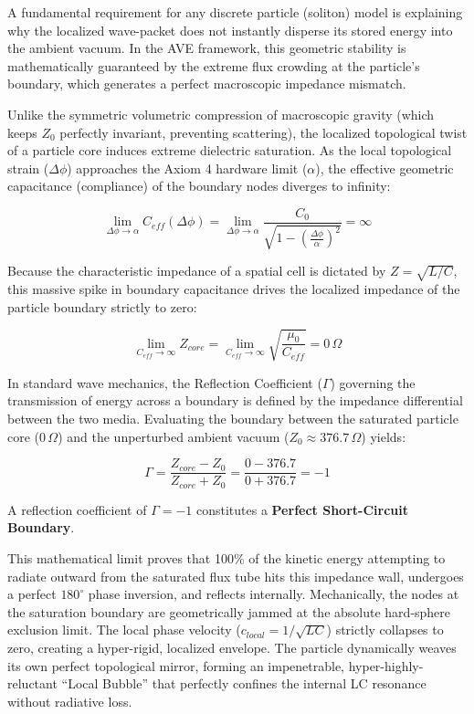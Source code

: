 A fundamental requirement for any discrete particle (soliton) model is explaining why the
localized wave-packet does not instantly disperse its stored energy into the ambient vacuum.
In the AVE framework, this geometric stability is mathematically guaranteed by the extreme
flux crowding at the particle's boundary, which generates a perfect macroscopic impedance
mismatch.

Unlike the symmetric volumetric compression of macroscopic gravity (which keeps $Z_{0}$
perfectly invariant, preventing scattering), the localized topological twist of a particle core
induces extreme dielectric saturation. As the local topological strain ($\Delta\phi$) approaches the
Axiom 4 hardware limit ($\alpha$), the effective geometric capacitance (compliance) of the boundary
nodes diverges to infinity:

\begin{equation}
\lim_{\Delta\phi \to \alpha} C_{eff}(\Delta\phi) = \lim_{\Delta\phi \to \alpha} \frac{C_{0}}{\sqrt{1-\left(\frac{\Delta\phi}{\alpha}\right)^{2}}} = \infty
\end{equation}

Because the characteristic impedance of a spatial cell is dictated by $Z=\sqrt{L/C}$, this
massive spike in boundary capacitance drives the localized impedance of the particle boundary
strictly to zero:

\begin{equation}
\lim_{C_{eff} \to \infty} Z_{core} = \lim_{C_{eff} \to \infty} \sqrt{\frac{\mu_{0}}{C_{eff}}} = 0\,\Omega
\end{equation}

In standard wave mechanics, the Reflection Coefficient ($\Gamma$) governing the transmission of
energy across a boundary is defined by the impedance differential between the two media.
Evaluating the boundary between the saturated particle core ($0\,\Omega$) and the unperturbed
ambient vacuum ($Z_{0}\approx376.7\,\Omega$) yields:

\begin{equation}
\Gamma=\frac{Z_{core}-Z_{0}}{Z_{core}+Z_{0}}=\frac{0-376.7}{0+376.7}=-1
\end{equation}

A reflection coefficient of $\Gamma=-1$ constitutes a \textbf{Perfect Short-Circuit Boundary}.

This mathematical limit proves that 100\% of the kinetic energy attempting to radiate
outward from the saturated flux tube hits this impedance wall, undergoes a perfect $180^{\circ}$ phase
inversion, and reflects internally. Mechanically, the nodes at the saturation boundary are
geometrically jammed at the absolute hard-sphere exclusion limit. The local phase velocity
($c_{local}=1/\sqrt{LC}$) strictly collapses to zero, creating a hyper-rigid, localized envelope. The
particle dynamically weaves its own perfect topological mirror, forming an impenetrable,
hyper-highly-reluctant ``Local Bubble'' that perfectly confines the internal LC resonance without
radiative loss.

